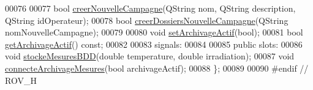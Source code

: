 \begin{DoxyCode}
00076 
00077         \textcolor{keywordtype}{bool} \hyperlink{class_rov_ae1306036b067e9ad50a09f9dd607a092}{creerNouvelleCampagne}(QString nom, QString description, QString 
      idOperateur);
00078         \textcolor{keywordtype}{bool} \hyperlink{class_rov_a970f36e93f9dbd22734db571b21ceb04}{creerDossiersNouvelleCampagne}(QString nomNouvelleCampagne);
00079 
00080         \textcolor{keywordtype}{void} \hyperlink{class_rov_abbe2eb87a00b651c8259c0c7abca3edd}{setArchivageActif}(\textcolor{keywordtype}{bool});   
00081         \textcolor{keywordtype}{bool} \hyperlink{class_rov_ac24b94eaac569252bdc0b1919489a761}{getArchivageActif}() \textcolor{keyword}{const}; 
00082 
00083     signals:
00084 
00085     \textcolor{keyword}{public} slots:        
00086         \textcolor{keywordtype}{void} \hyperlink{class_rov_adab08abfde381c2915695489b34da6b4}{stockeMesuresBDD}(\textcolor{keywordtype}{double} temperature, \textcolor{keywordtype}{double} irradiation);  
00087         \textcolor{keywordtype}{void} \hyperlink{class_rov_a738965ca84678b506b3d6a326c48e9e3}{connecteArchivageMesures}(\textcolor{keywordtype}{bool} archivageActif);             
00088 \};
00089 
00090 \textcolor{preprocessor}{#endif // ROV\_H}
\end{DoxyCode}
